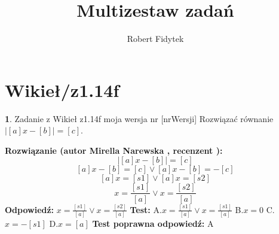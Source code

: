 \documentclass[12pt, a4paper]{article}
\title{Multizestaw zadań}
\author{Robert Fidytek}
\date{}
\theoremstyle{definition} %
\newtheorem{zad}{}
\newcommand{\kategoria}[1]{\section{#1}} %
\newcommand{\zadStart}[1]{\begin{zad}#1\newline} %
\newcommand{\zadStop}{\end{zad}}   %
\newcommand{\rozwStart}[2]{\noindent \textbf{Rozwiązanie (autor #1 , recenzent #2): }\newline} %
\newcommand{\rozwStop}{\newline}                                            %
\newcommand{\odpStart}{\noindent \textbf{Odpowiedź:}\newline}    %
\newcommand{\odpStop}{\newline}                                             %
\newcommand{\testStart}{\noindent \textbf{Test:}\newline} %
\newcommand{\testStop}{\newline} %
\newcommand{\kluczStart}{\noindent \textbf{Test poprawna odpowiedź:}\newline} %
\newcommand{\kluczStop}{\newline} %
\begin{document}
\maketitle


\kategoria{Wikieł/z1.14f}
\zadStart{Zadanie z Wikieł z1.14f moja wersja nr [nrWersji]}
Rozwiązać równanie  $|[a]x-[b]|=[c]$.
\zadStop
\rozwStart{Mirella Narewska}{}
$$|[a]x-[b]|=[c]  $$
$$[a]x-[b]=[c]  \vee [a]x-[b]=-[c]$$
$$ [a]x=[s1] \vee  [a]x=[s2] $$ 
$$ x=\frac{[s1]}{[a]} \vee x=\frac{[s2]}{[a]}$$ 
\rozwStop
\odpStart
$x=\frac{[s1]}{[a]} \vee x=\frac{[s2]}{[a]}$
\odpStop
\testStart
A.$x=\frac{[s1]}{[a]} \vee x=\frac{[s1]}{[a]}$
B.$x=0$
C.$x=-[s1]$
D.$x=[a]$
\testStop
\kluczStart
A
\kluczStop
\end{document}
